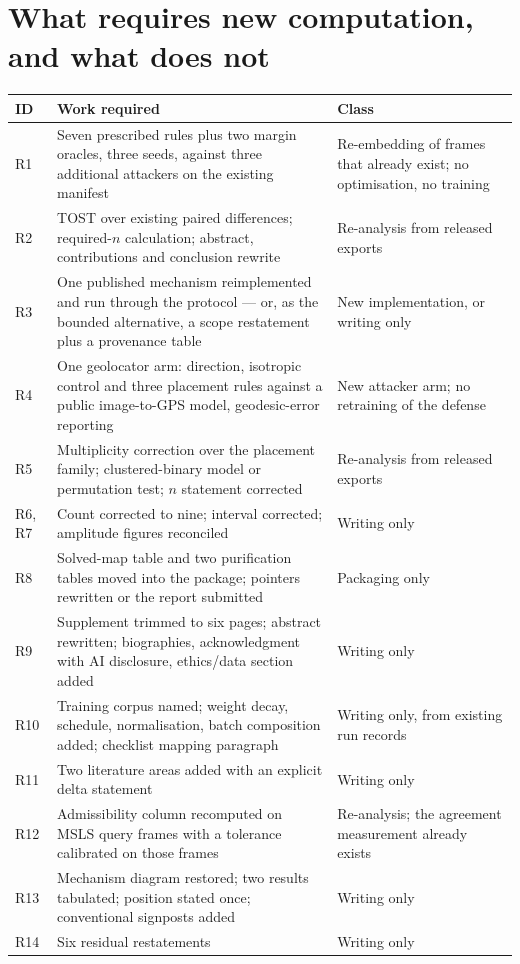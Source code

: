 \documentclass[11pt,a4paper]{article}
\begin{document}
\section{What requires new computation, and what does not}
\label{sec:cost}

\begin{longtable}{L{0.08\textwidth} L{0.46\textwidth} L{0.40\textwidth}}
\toprule
\textbf{ID} & \textbf{Work required} & \textbf{Class} \\
\midrule
\endhead
R1 & Seven prescribed rules plus two margin oracles, three seeds, against three
additional attackers on the existing manifest & Re-embedding of frames that
already exist; no optimisation, no training \\
R2 & TOST over existing paired differences; required-$n$ calculation; abstract,
contributions and conclusion rewrite & Re-analysis from released exports \\
R3 & One published mechanism reimplemented and run through the protocol ---
or, as the bounded alternative, a scope restatement plus a provenance table &
New implementation, or writing only \\
R4 & One geolocator arm: direction, isotropic control and three placement rules
against a public image-to-GPS model, geodesic-error reporting & New attacker
arm; no retraining of the defense \\
R5 & Multiplicity correction over the placement family; clustered-binary model
or permutation test; $n$ statement corrected & Re-analysis from released
exports \\
R6, R7 & Count corrected to nine; interval corrected; amplitude figures
reconciled & Writing only \\
R8 & Solved-map table and two purification tables moved into the package;
pointers rewritten or the report submitted & Packaging only \\
R9 & Supplement trimmed to six pages; abstract rewritten; biographies,
acknowledgment with AI disclosure, ethics/data section added & Writing only \\
R10 & Training corpus named; weight decay, schedule, normalisation,
batch composition added; checklist mapping paragraph & Writing only, from
existing run records \\
R11 & Two literature areas added with an explicit delta statement & Writing
only \\
R12 & Admissibility column recomputed on MSLS query frames with a tolerance
calibrated on those frames & Re-analysis; the agreement measurement already
exists \\
R13 & Mechanism diagram restored; two results tabulated; position stated once;
conventional signposts added & Writing only \\
R14 & Six residual restatements & Writing only \\
\bottomrule
\end{longtable}
\end{document}
